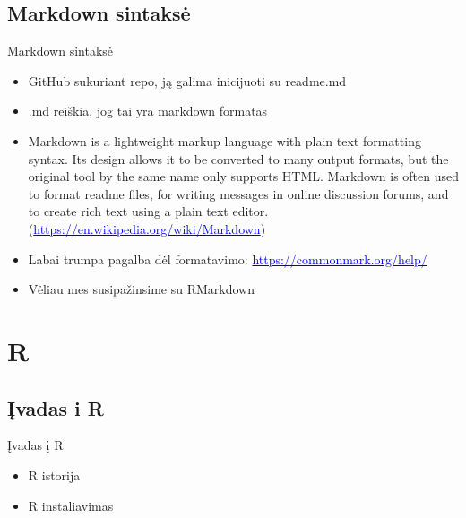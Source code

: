 \documentclass[11pt,xcolor=table]{beamer}
\begin{document}
\subsection{Markdown sintaksė}
\begin{frame}[fragile]{Markdown sintaksė}
\begin{itemize}
\item GitHub sukuriant repo, ją galima inicijuoti su readme.md
\item .md reiškia, jog tai yra markdown formatas
\item Markdown is a lightweight markup language with plain text formatting syntax. Its design allows it to be converted to many output formats, but the original tool by the same name only supports HTML. Markdown is often used to format readme files, for writing messages in online discussion forums, and to create rich text using a plain text editor. (\href{https://en.wikipedia.org/wiki/Markdown}{\textcolor{blue}{https://en.wikipedia.org/wiki/Markdown}})
\item Labai trumpa pagalba dėl formatavimo: \href{https://commonmark.org/help/}{\textcolor{blue}{https://commonmark.org/help/}}
\item Vėliau mes susipažinsime su RMarkdown
\end{itemize}
\end{frame}

\section{R}

\subsection{Įvadas i R}

\begin{frame}{Įvadas į R}
\begin{itemize}
\item R istorija
\item R instaliavimas
\end{itemize}
\end{frame}
\end{document}
